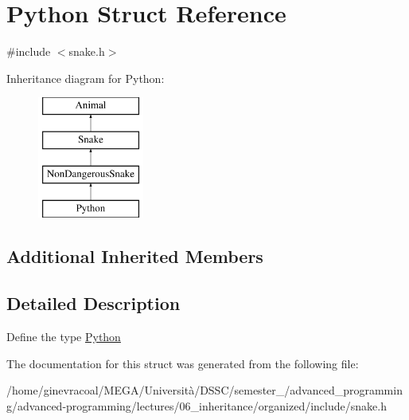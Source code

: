 \hypertarget{structPython}{}\section{Python Struct Reference}
\label{structPython}


{\ttfamily \#include $<$snake.\+h$>$}

Inheritance diagram for Python\+:\begin{figure}[H]
\begin{center}
\leavevmode
\includegraphics[height=4.000000cm]{structPython}
\end{center}
\end{figure}
\subsection*{Additional Inherited Members}


\subsection{Detailed Description}
Define the type \hyperlink{structPython}{Python} 

The documentation for this struct was generated from the following file\+:\begin{DoxyCompactItemize}
\item 
/home/ginevracoal/\+M\+E\+G\+A/\+Università/\+D\+S\+S\+C/semester\+\_/advanced\+\_\+programming/advanced-\/programming/lectures/06\+\_\+inheritance/organized/include/snake.\+h\end{DoxyCompactItemize}
